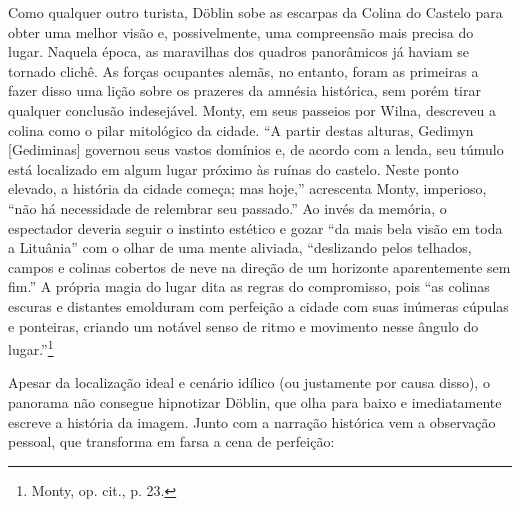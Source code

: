 Como qualquer outro turista, Döblin sobe as escarpas da Colina do
Castelo para obter uma melhor visão e, possivelmente, uma compreensão
mais precisa do lugar. Naquela época, as maravilhas dos quadros
panorâmicos já haviam se tornado clichê. As forças ocupantes alemãs, no
entanto, foram as primeiras a fazer disso uma lição sobre os prazeres da
amnésia histórica, sem porém tirar qualquer conclusão indesejável.
Monty, em seus passeios por Wilna, descreveu a colina como o pilar
mitológico da cidade. ``A partir destas alturas, Gedimyn {[}Gediminas{]}
governou seus vastos domínios e, de acordo com a lenda, seu túmulo está
localizado em algum lugar próximo às ruínas do castelo. Neste ponto
elevado, a história da cidade começa; mas hoje,'' acrescenta Monty,
imperioso, ``não há necessidade de relembrar seu passado.'' Ao invés da
memória, o espectador deveria seguir o instinto estético e gozar ``da
mais bela visão em toda a Lituânia'' com o olhar de uma mente aliviada,
``deslizando pelos telhados, campos e colinas cobertos de neve na
direção de um horizonte aparentemente sem fim.'' A própria magia do
lugar dita as regras do compromisso, pois ``as colinas escuras e
distantes emolduram com perfeição a cidade com suas inúmeras cúpulas e
ponteiras, criando um notável senso de ritmo e movimento nesse ângulo do
lugar.''\footnote{Monty, op. cit., p. 23.}

%

Apesar da localização ideal e cenário idílico (ou justamente por causa
disso), o panorama não consegue hipnotizar Döblin, que olha para baixo e
imediatamente escreve a história da imagem. Junto com a narração
histórica vem a observação pessoal, que transforma em farsa a cena de
perfeição:

